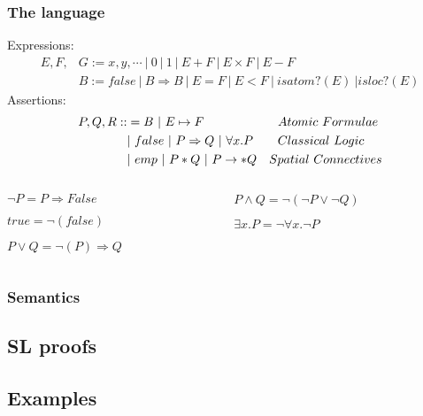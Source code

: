 \documentclass{beamer}
\begin{document}
    \begin{frame}
        \frametitle{The language}
        
        Expressions:
        \begin{equation*}
            \begin{split}
            E,F,&G := x,y,\cdots\ |\ 0\ |\ 1\ |\ E + F\ |\ E \times F\ |\ E - F \\
            &B := false\ |\ B \Rightarrow B\ |\ E=F\ |\ E<F\ |\ isatom?(E)\ | isloc?(E)
            \end{split}
        \end{equation*}
    \pause
    Assertions:
     \begin{equation*}
        \begin{split}
        P,Q,R ::&= B\ |\ E \mapsto F \hspace{21mm}Atomic\ Formulae \\
            &|\ false\ |\ P \Rightarrow Q\ |\ \forall x.P \hspace{7mm}Classical\ Logic \\
            &|\ emp\  |\ P * Q\ |\ P \rightarrow* Q \quad Spatial\ Connectives
        \end{split}      
     \end{equation*}
     
     \begin{columns}
         \begin{column}{.5\textwidth}
             \pause
             $\neg P = P \Rightarrow False$
             
             
             $true = \neg(false)$
             
             
             $P \vee Q = \neg(P) \Rightarrow Q$  
         \end{column}
         \begin{column}{.5\textwidth}
             \pause
             $P \wedge Q = \neg(\neg P \vee \neg Q)$

             $\exists x.P = \neg\forall x.\neg P$
         \end{column}
     \end{columns}
    \end{frame}
    \begin{frame}
        \frametitle{Semantics}
    \end{frame}
    \subsection{SL proofs}
    \subsection{Examples}
\end{document}
